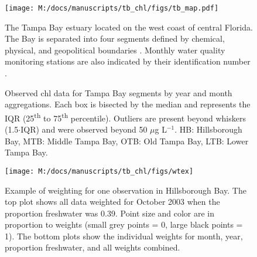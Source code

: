 \documentclass{svjour3}\usepackage[]{graphicx}\usepackage[]{color}
\newcommand{\mugl}{$\mu$g L$^{-1}$}
\begin{document}
\clearpage


\begin{figure}
\centering
\texttt{[image: M:/docs/manuscripts/tb\_chl/figs/tb\_map.pdf]}
\caption{The Tampa Bay estuary located on the west coast of central Florida. The Bay is separated into four segments defined by chemical, physical, and geopolitical boundaries \cite{Lewis85}. Monthly water quality monitoring stations are also indicated by their identification number \cite{Boler01}.}
\label{fig:tb_map}
\end{figure}


\begin{figure}
\centering
{}


\leavevmode\smash{\makebox[0pt]{\hspace{0em}%
  \rotatebox[origin=l]{90}{\hspace{19em}%
    Chlorophyll-\textit{a} (\mugl)}%
}}\hspace{0pt plus 1filll}\null

\caption{Observed \ac{chl} data for Tampa Bay segments by \protect{} year and \protect{} month aggregations.  Each box is bisected by the median and represents the \ac{IQR} (25\textsuperscript{th} to 75\textsuperscript{th} percentile).  Outliers are present beyond whiskers (1.5$\cdot$\ac{IQR}) and were observed beyond 50 \mugl.  HB: Hillsborough Bay, MTB: Middle Tampa Bay, OTB: Old Tampa Bay, LTB: Lower Tampa Bay.}
\label{fig:obsyrmo}
\end{figure}

\begin{figure}[!ht]


{\centering \texttt{[image: M:/docs/manuscripts/tb\_chl/figs/wtex]} 

}

\caption[Example of weighting for one observation in Hillsborough Bay]{Example of weighting for one observation in Hillsborough Bay.  The top plot shows all data weighted for October 2003 when the proportion freshwater was 0.39.  Point size and color are in proportion to weights (small grey points = 0, large black points = 1).  The bottom plots show the individual weights for month, year, proportion freshwater, and all weights combined.\label{fig:wtex}}
\end{figure}
\end{document}
